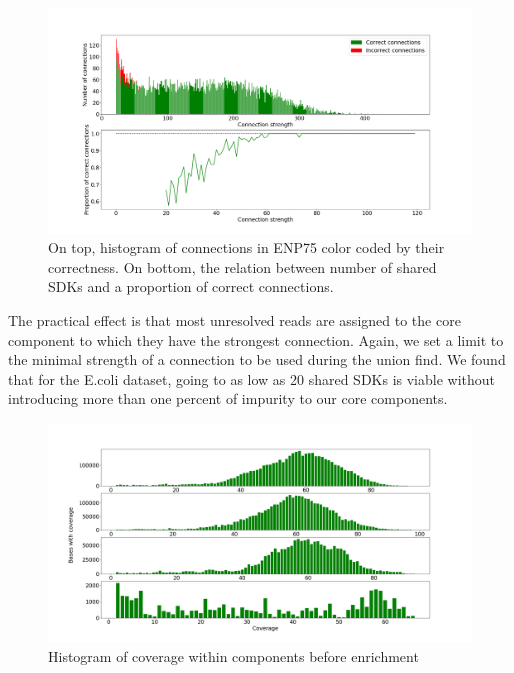 \begin{figure}
\includegraphics[width=400bp]{figures/connections_enrichment.png}
\caption{On top, histogram of connections in ENP75 color coded by their correctness. On bottom, the relation between number of shared SDKs and a proportion of correct connections.}
\label{fig:conn_enrich}
\end{figure}

The practical effect is that most unresolved reads are assigned to the core component to which they have the strongest connection. Again, we set a limit to the minimal strength of a connection to be used during the union find. We found that for the E.coli dataset, going to as low as 20 shared SDKs is viable without introducing more than one percent of impurity to our core components.

\begin{figure}
\includegraphics[width=450bp]{figures/coverage_before.png}
\caption{Histogram of coverage within components before enrichment}
\label{fig:coverage}
\end{figure}

